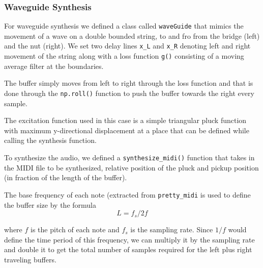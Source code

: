 \documentclass[11pt]{article}
\begin{document}
\subsubsection{Waveguide Synthesis}

For waveguide synthesis we defined a class called \texttt{waveGuide} that mimics the movement of a wave on a double bounded string, to and fro from the bridge (left) and the nut (right). We set two delay lines \texttt{x\_L} and \texttt{x\_R} denoting left and right movement of the string along with a loss function \texttt{g()} consisting of a moving average filter at the boundaries. 

The buffer simply moves from left to right through the loss function and that is done through the \texttt{np.roll()} function to push the buffer towards the right every sample. 

The excitation function used in this case is a simple triangular pluck function with maximum y-directional displacement at a place that can be defined while calling the synthesis function. 

To synthesize the audio, we defined a \texttt{synthesize\_midi()} function that takes in the MIDI file to be synthesized, relative position of the pluck and pickup position (in fraction of the length of the buffer).

The base frequency of each note (extracted from \texttt{pretty\_midi} is used to define the buffer size by the formula 
\begin{equation}
    L = f_s/2f    
\end{equation}


where $f$ is the pitch of each note and $f_s$ is the sampling rate. Since $1/f$ would define the time period of this frequency, we can multiply it by the sampling rate and double it to get the total number of samples required for the left plus right traveling buffers. 
\end{document}
